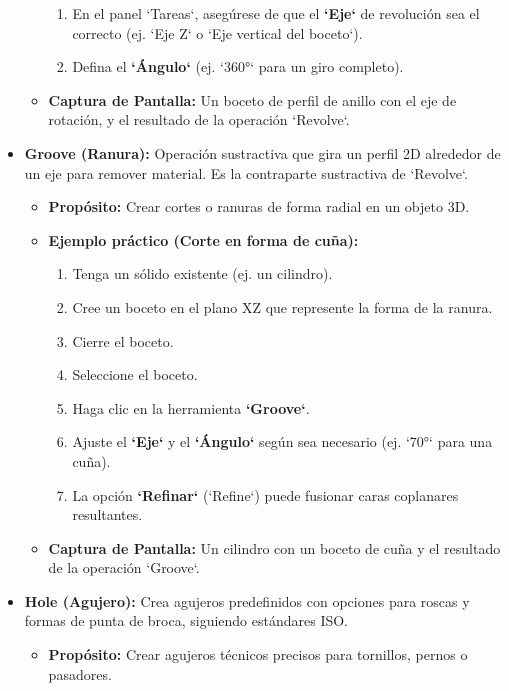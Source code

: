 \documentclass[12pt]{article}
\begin{document}
\begin{itemize}[label=\textbullet]
\begin{itemize}[label=\textendash]
\begin{enumerate}[label=\arabic*)]
            \item En el panel `Tareas`, asegúrese de que el \textbf{`Eje`} de revolución sea el correcto (ej. `Eje Z` o `Eje vertical del boceto`).
            \item Defina el \textbf{`Ángulo`} (ej. `360°` para un giro completo).
        \end{enumerate}
        \item \textbf{Captura de Pantalla:} Un boceto de perfil de anillo con el eje de rotación, y el resultado de la operación `Revolve`.
    \end{itemize}
    \item \textbf{Groove (Ranura):} Operación sustractiva que gira un perfil 2D alrededor de un eje para remover material. Es la contraparte sustractiva de `Revolve`.
    \begin{itemize}[label=\textendash]
        \item \textbf{Propósito:} Crear cortes o ranuras de forma radial en un objeto 3D.
        \item \textbf{Ejemplo práctico (Corte en forma de cuña):}
        \begin{enumerate}[label=\arabic*)]
            \item Tenga un sólido existente (ej. un cilindro).
            \item Cree un boceto en el plano XZ que represente la forma de la ranura.
            \item Cierre el boceto.
            \item Seleccione el boceto.
            \item Haga clic en la herramienta \textbf{`Groove`}.
            \item Ajuste el \textbf{`Eje`} y el \textbf{`Ángulo`} según sea necesario (ej. `70°` para una cuña).
            \item La opción \textbf{`Refinar`} (`Refine`) puede fusionar caras coplanares resultantes.
        \end{enumerate}
        \item \textbf{Captura de Pantalla:} Un cilindro con un boceto de cuña y el resultado de la operación `Groove`.
    \end{itemize}
    \item \textbf{Hole (Agujero):} Crea agujeros predefinidos con opciones para roscas y formas de punta de broca, siguiendo estándares ISO.
    \begin{itemize}[label=\textendash]
        \item \textbf{Propósito:} Crear agujeros técnicos precisos para tornillos, pernos o pasadores.

\end{itemize}
\end{itemize}
\end{document}
